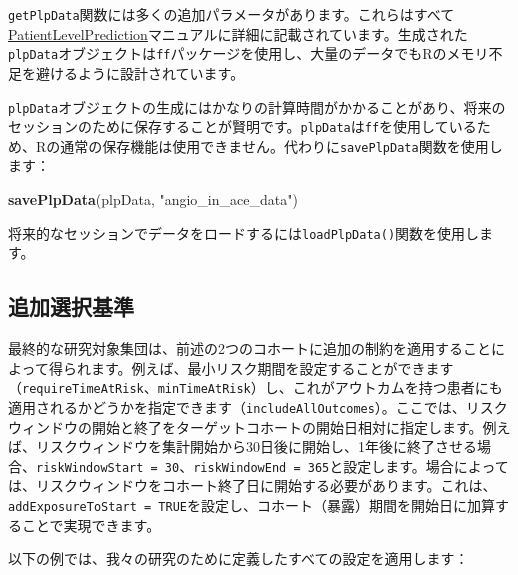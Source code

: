 \documentclass[
  11pt]{book}
\newenvironment{Shaded}{\begin{snugshade}}{\end{snugshade}}
\newcommand{\FunctionTok}[1]{\textcolor[rgb]{0.13,0.29,0.53}{\textbf{#1}}}
\newcommand{\NormalTok}[1]{#1}
\newcommand{\StringTok}[1]{\textcolor[rgb]{0.31,0.60,0.02}{#1}}
\theoremstyle{definition}
\theoremstyle{definition}
\theoremstyle{definition}
\theoremstyle{definition}
\theoremstyle{remark}
\begin{document}
\texttt{getPlpData}関数には多くの追加パラメータがあります。これらはすべて\href{https://ohdsi.github.io/PatientLevelPrediction/}{PatientLevelPrediction}マニュアルに詳細に記載されています。生成された\texttt{plpData}オブジェクトは\texttt{ff}パッケージを使用し、大量のデータでもRのメモリ不足を避けるように設計されています。

\texttt{plpData}オブジェクトの生成にはかなりの計算時間がかかることがあり、将来のセッションのために保存することが賢明です。\texttt{plpData}は\texttt{ff}を使用しているため、Rの通常の保存機能は使用できません。代わりに\texttt{savePlpData}関数を使用します：

\begin{Shaded}
\begin{Highlighting}[]
\FunctionTok{savePlpData}\NormalTok{(plpData, }\StringTok{"angio\_in\_ace\_data"}\NormalTok{)}
\end{Highlighting}
\end{Shaded}

将来的なセッションでデータをロードするには\texttt{loadPlpData()}関数を使用します。

\subsection{追加選択基準}\label{ux8ffdux52a0ux9078ux629eux57faux6e96}

最終的な研究対象集団は、前述の2つのコホートに追加の制約を適用することによって得られます。例えば、最小リスク期間を設定することができます（\texttt{requireTimeAtRisk}、\texttt{minTimeAtRisk}）し、これがアウトカムを持つ患者にも適用されるかどうかを指定できます（\texttt{includeAllOutcomes}）。ここでは、リスクウィンドウの開始と終了をターゲットコホートの開始日相対に指定します。例えば、リスクウィンドウを集計開始から30日後に開始し、1年後に終了させる場合、\texttt{riskWindowStart\ =\ 30}、\texttt{riskWindowEnd\ =\ 365}と設定します。場合によっては、リスクウィンドウをコホート終了日に開始する必要があります。これは、\texttt{addExposureToStart\ =\ TRUE}を設定し、コホート（暴露）期間を開始日に加算することで実現できます。

以下の例では、我々の研究のために定義したすべての設定を適用します：
\end{document}
